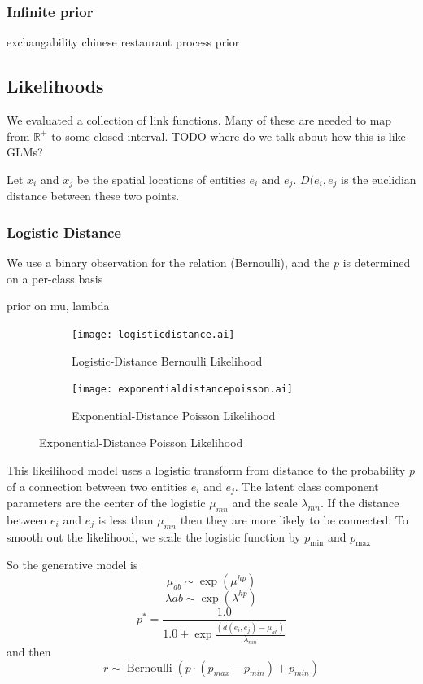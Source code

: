\documentclass{article}
\begin{document}
\subsubsection{Infinite prior}
exchangability 
chinese restaurant process prior



\subsection{Likelihoods}
We evaluated a collection of link functions. 
Many of these are needed to map from $\mathbb{R}^+$ to some closed interval. 
TODO where do we talk about how this is like GLMs? 

Let $x_i$ and $x_j$ be the spatial locations of entities $e_i$ and $e_j$. $D(e_i, e_j$ is the euclidian distance between these two points. 
 
\subsubsection{Logistic Distance}
We use a binary observation for the relation (Bernoulli), and the $p$ is determined
on a per-class basis

prior on mu, lambda

\begin{figure}
  \centering 
  \begin{subfigure}[b]{0.4\textwidth}
    \texttt{[image: logisticdistance.ai]}
    \caption{Logistic-Distance Bernoulli Likelihood}
    \label{fig:gull}
  \end{subfigure}
  \begin{subfigure}[b]{0.4\textwidth}
    \texttt{[image: exponentialdistancepoisson.ai]}
    \caption{Exponential-Distance Poisson Likelihood}
    \label{fig:gull}
  \end{subfigure}

\end{figure}

This likeilihood model uses a logistic transform from distance to the
probability $p$ of a connection between two entities $e_i$ and
$e_j$. The latent class component parameters are the center of the
logistic $\mu_{mn}$ and the scale $\lambda_{mn}$. If the distance
between $e_i$ and $e_j$ is less than $\mu_{mn}$ then they are more
likely to be connected. To smooth out the likelihood, we scale the logistic
function by $p_{\textrm{min}}$ and $p_{\textrm{max}}$

So the generative model is
\[\mu_{ab} \sim \exp(\mu^{hp}) \]
\[\lambda{ab} \sim \exp(\lambda^{hp}) \]
\[p^* = \frac{1.0}{1.0 + \exp{\frac{(d(e_i, e_j) - \mu_{ab})}{\lambda_{mn}}}}\]
and then 
\[ r \sim \operatorname{Bernoulli}(p\cdot (p_{max} - p_{min}) + p_{min}) \]
\end{document}
